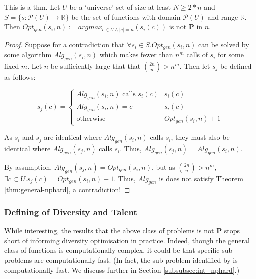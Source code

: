 \begin{theorem}\label{thm:general-nphard}
    This is a thm.
    Let $U$ be a `universe' set of size at least $N \geq 2*n$ and $S = \{s: \mathcal{P} (U) \rightarrow \mathbb{R}\}$ be the set of functions with domain  $\mathcal{P} (U)$ and range $\mathbb{R}$. Then $Opt_{gen}(s_i, n) := argmax_{c \in U \land |c| = n}(s_i(c))$ is not $\mathbf{P}$ in $n$.
\end{theorem}

\begin{proof}
Suppose for a contradiction that $\forall s_i \in S . Opt_{gen}(s_i, n)$ can be solved by some algorithm $Alg_{gen}(s_i, n)$ which makes fewer than $n^m$ calls of $s_i$ for some fixed $m$. Let $n$ be sufficiently large that that $\binom{2n}{n} > n^m$. Then let $s_j$ be defined as follows:

\begin{equation}
s_j(c) = 
    \begin{cases} 
        Alg_{gen}(s_i, n) \text{ calls } s_i(c) & s_i(c) \\
        Alg_{gen}(s_i, n) = c & s_i(c)          \\
        \text{otherwise} & Opt_{gen}(s_i, n) + 1 
    \end{cases}
\end{equation}

\noindent As $s_i$ and $s_j$ are identical where $Alg_{gen}(s_i, n)$ calls $s_i$, they must also be identical where $Alg_{gen}(s_j, n)$ calls $s_i$. Thus, $Alg_{gen}(s_j, n) = Alg_{gen}(s_i, n)$.

By assumption, $Alg_{gen}(s_j, n) = Opt_{gen}(s_i, n)$, but as $\binom{2n}{n} > n^m$, $\exists c \subset U . s_j(c) = Opt_{gen}(s_i, n) + 1$. Thus, $Alg_{gen}$ is does not satisfy Theorem \ref{thm:general-nphard}, a contradiction!
\end{proof}

\subsubsection{Defining of Diversity and Talent}\label{subsubsec:div_talent_def}
While interesting, the results that the above class of problems is not $\mathbf{P}$ stops short of informing diversity optimisation in practice. Indeed, though the general class of functions is computationally complex, it could be that specific sub-problems are computationally fast. (In fact, the sub-problem identified by \textcite{kleinberg2018algorithmic} is computationally fast. We discuss further in Section \ref{subsubsec:int_nphard}.)

